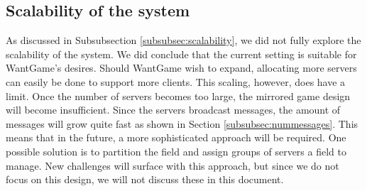 	\subsection{Scalability of the system}
	\label{subsec:scalability_system_discussion}
		As discussed in Subsubsection \ref{subsubsec:scalability}, we did not fully explore the scalability of the system. 
		We did conclude that the current setting is suitable for WantGame's desires. 
		Should WantGame wish to expand, allocating more servers can easily be done to support more clients. 
		This scaling, however, does have a limit. Once the number of servers becomes too large, the mirrored game design will become insufficient.
		Since the servers broadcast messages, the amount of messages will grow quite fast as shown in Section \ref{subsubsec:nummessages}. This means that in the future, a more sophisticated approach will be required. 
		One possible solution is to partition the field and assign groups of servers a field to manage. 
		New challenges will surface with this approach, but since we do not focus on this design, we will not discuss these in this document.
